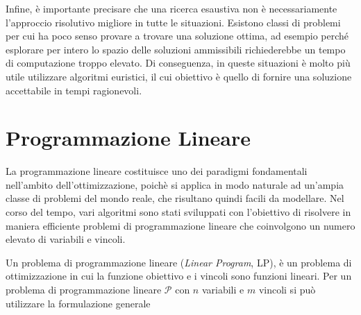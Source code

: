 Infine, è importante precisare che una ricerca esaustiva non è necessariamente l'approccio risolutivo migliore in tutte
le situazioni. Esistono classi di problemi per cui ha poco senso provare a trovare una soluzione ottima, ad esempio
perché esplorare per intero lo spazio delle soluzioni ammissibili richiederebbe un tempo di computazione troppo elevato.
Di conseguenza, in queste situazioni è molto più utile utilizzare algoritmi euristici, il cui obiettivo è quello di
fornire una soluzione accettabile in tempi ragionevoli.

\section{Programmazione Lineare}
La programmazione lineare costituisce uno dei paradigmi fondamentali nell'ambito dell'ottimizzazione, poichè si applica
in modo naturale ad un'ampia classe di problemi del mondo reale, che risultano quindi facili da modellare. Nel corso del
tempo, vari algoritmi sono stati sviluppati con l'obiettivo di risolvere in maniera efficiente problemi di
programmazione lineare che coinvolgono un numero elevato di variabili e vincoli.

Un problema di programmazione lineare (\textit{Linear Program}, LP), è un problema di ottimizzazione in cui la funzione
obiettivo e i vincoli sono funzioni lineari. Per un problema di programmazione lineare \( \mathcal{P} \) con \( n \)
variabili e \( m \) vincoli si può utilizzare la formulazione generale

